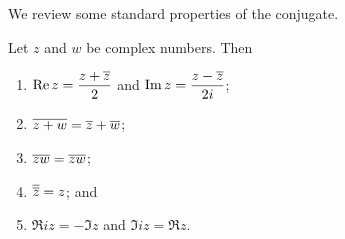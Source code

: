 We review some standard properties of the conjugate.

\begin{theorem}
    Let \(z\) and \(w\) be complex numbers. Then
    \begin{enumerate}[label=(\alph*)]
        \item \(\displaystyle\operatorname{Re} z = \frac{z + \overline{z}}{2}\) and \(\displaystyle\operatorname{Im} z = \frac{z - \overline{z}}{2i}\);
        \item \(\overline{z + w} = \overline{z} + \overline{w}\);
        \item \(\overline{zw} = \overline{z}\overline{w}\);
        \item \(\overline{\overline{z}} = z\); and 
        \item \(\Re iz = -\Im z\) and \(\Im iz = \Re z\).
    \end{enumerate}
    \label{thm:conjugate}
\end{theorem}

